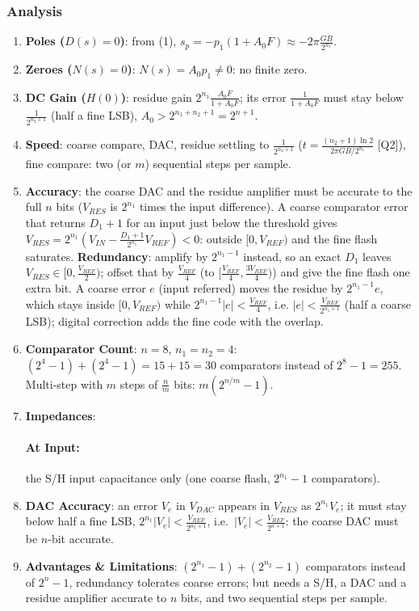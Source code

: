 \subsubsection{Analysis}
\begin{enumerate}
  \item \textbf{Poles (\(D(s) = 0\))}: from (1), \(s_p = -p_1(1 + A_0 F) \approx -2\pi\frac{GB}{2^{n_1}}\).
  \item \textbf{Zeroes (\(N(s) = 0\))}: \(N(s) = A_0 p_1 \neq 0\): no finite zero.
  \item \textbf{DC Gain (\(H(0)\))}: residue gain \(2^{n_1}\frac{A_0 F}{1 + A_0 F}\); its error
    \(\frac{1}{1 + A_0 F}\) must stay below \(\frac{1}{2^{n_2 + 1}}\) (half a fine LSB), \(A_0 > 2^{n_1 + n_2 + 1} = 2^{n+1}\).
  \item \textbf{Speed}: coarse compare, DAC, residue settling to \(\frac{1}{2^{n_2+1}}\)
    (\(t = \frac{(n_2 + 1)\ln 2}{2\pi GB / 2^{n_1}}\) [Q2]), fine compare: two (or \(m\)) sequential steps per sample.
  \item \textbf{Accuracy}: the coarse DAC and the residue amplifier must be
    accurate to the full \(n\) bits (\(V_{RES}\) is \(2^{n_1}\) times the input
    difference). A coarse comparator error that returns \(D_1 + 1\) for an
    input just below the threshold gives
    \(V_{RES} = 2^{n_1}\left(V_{IN} - \frac{D_1 + 1}{2^{n_1}} V_{REF}\right) < 0\): outside \([0, V_{REF})\)
    and the fine flash saturates. \textbf{Redundancy}: amplify by \(2^{n_1 - 1}\)
    instead, so an exact \(D_1\) leaves \(V_{RES} \in [0, \frac{V_{REF}}{2})\); offset that by
    \(\frac{V_{REF}}{4}\) (to \([\frac{V_{REF}}{4}, \frac{3V_{REF}}{4})\)) and give the fine flash one extra
    bit. A coarse error \(e\) (input referred) moves the residue by
    \(2^{n_1 - 1} e\), which stays inside \([0, V_{REF})\) while
    \(2^{n_1 - 1}|e| < \frac{V_{REF}}{4}\), i.e. \(|e| < \frac{V_{REF}}{2^{n_1 + 1}}\) (half a coarse
    LSB); digital correction adds the fine code with the overlap.
  \item \textbf{Comparator Count}: \(n = 8\), \(n_1 = n_2 = 4\):
    \((2^4 - 1) + (2^4 - 1) = 15 + 15 = 30\) comparators instead of
    \(2^8 - 1 = 255\). Multi-step with \(m\) steps of \(\frac{n}{m}\) bits:
    \(m(2^{n/m} - 1)\).
  \item \textbf{Impedances}:
    \paragraph{At Input:} the S/H input capacitance only (one coarse flash, \(2^{n_1} - 1\) comparators).
  \item \textbf{DAC Accuracy}: an error \(V_e\) in \(V_{DAC}\) appears in \(V_{RES}\) as \(2^{n_1}V_e\); it must stay below
    half a fine LSB, \(2^{n_1}|V_e| < \frac{V_{REF}}{2^{n_2+1}}\), i.e.\ \(|V_e| < \frac{V_{REF}}{2^{n+1}}\): the coarse DAC must be \(n\)-bit accurate.
  \item \textbf{Advantages \& Limitations}: \((2^{n_1} - 1) + (2^{n_2} - 1)\) comparators instead of \(2^n - 1\),
    redundancy tolerates coarse errors; but needs a S/H, a DAC and a residue amplifier accurate to
    \(n\) bits, and two sequential steps per sample.
\end{enumerate}

